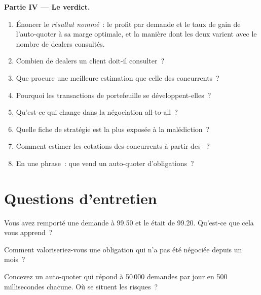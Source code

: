 \begin{problem}
\medskip\noindent\textbf{Partie IV --- Le verdict.}
\begin{enumerate}[resume]
\item Énoncer le \emph{résultat nommé}~: le profit par demande et le taux de gain de l'auto-quoter à sa marge optimale, et la manière dont les deux varient avec le nombre de
dealers consultés.
\item Combien de dealers un client doit-il consulter~?
\item Que procure une meilleure estimation que celle des concurrents~?
\item Pourquoi les transactions de portefeuille se développent-elles~?
\item Qu'est-ce qui change dans la négociation all-to-all~?
\item Quelle fiche de stratégie est la plus exposée à la malédiction~?
\item Comment estimer les cotations des concurrents à partir des ~?
\item En une phrase~: que vend un auto-quoter d'obligations~?
\end{enumerate}
\end{problem}

\section{Questions d'entretien}

\begin{interviewq}\label{iq:hf:bond-and-etf-request-for-quote-market-making:1}
Vous avez remporté une demande à 99.50 et le  était de 99.20. Qu'est-ce que cela vous apprend~?
\end{interviewq}

\begin{interviewq}\label{iq:hf:bond-and-etf-request-for-quote-market-making:2}
Comment valoriseriez-vous une obligation qui n'a pas été négociée depuis un mois~?
\end{interviewq}

\begin{interviewq}\label{iq:hf:bond-and-etf-request-for-quote-market-making:3}
Concevez un auto-quoter qui répond à 50\,000 demandes par jour en 500 millisecondes chacune. Où se situent les risques~?
\end{interviewq}

